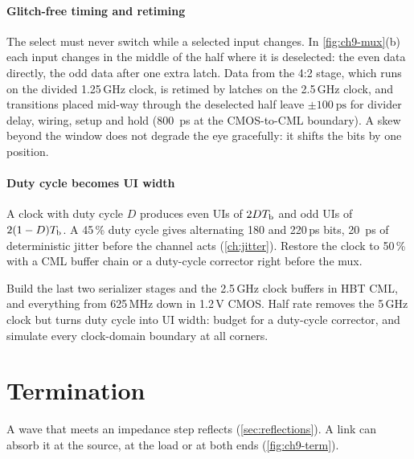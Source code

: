 \paragraph{Glitch-free timing and retiming} The select must never switch while a selected input changes. In \cref{fig:ch9-mux}(b) each input changes in the middle of the half where it is deselected: the even data directly, the odd data after one extra latch. Data from the 4:2 stage, which runs on the divided 1.25\,GHz clock, is retimed by latches on the 2.5\,GHz clock, and transitions placed mid-way through the deselected half leave $\pm\qty{100}{\pico\second}$ for divider delay, wiring, setup and hold (\qty{800}{\pico\second} at the CMOS-to-CML boundary). A skew beyond the window does not degrade the eye gracefully: it shifts the bits by one position.

\paragraph{Duty cycle becomes UI width} A clock with duty cycle $D$ produces even UIs of $2DT_\mathrm{b}$ and odd UIs of $2(1-D)T_\mathrm{b}$. A 45\,\% duty cycle gives alternating 180 and 220\,ps bits, \qty{20}{\pico\second} of deterministic jitter before the channel acts (\cref{ch:jitter}). Restore the clock to 50\,\% with a CML buffer chain or a duty-cycle corrector right before the mux.

\begin{insight}
Build the last two serializer stages and the 2.5\,GHz clock buffers in HBT CML, and everything from 625\,MHz down in 1.2\,V CMOS. Half rate removes the 5\,GHz clock but turns duty cycle into UI width: budget for a duty-cycle corrector, and simulate every clock-domain boundary at all corners.
\end{insight}

\section{Termination}\label{sec:termination}

A wave that meets an impedance step reflects (\cref{sec:reflections}). A link can absorb it at the source, at the load or at both ends (\cref{fig:ch9-term}).

